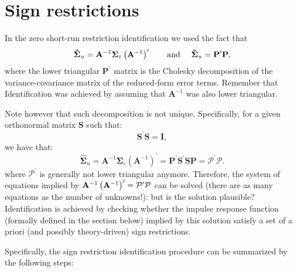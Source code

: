 \documentclass[11pt,a4paper]{report}
\numberwithin{equation}{chapter}
\numberwithin{section}{chapter}
\begin{document}
\section{Sign restrictions}

In the zero short-run restriction identification we used the fact that%
\begin{equation*}
\mathbf{\hat{\Sigma}}_{u}=\mathbf{A}^{-1}\mathbf{\Sigma }_{\varepsilon
}\left( \mathbf{A}^{-1}\right) ^{\prime }\text{ \ \ \ and \ \ \ }\mathbf{%
\hat{\Sigma}}_{u}=\mathbf{P}^{\prime }\mathbf{P,}
\end{equation*}%
where the lower triangular $\mathbf{P}^{\prime }$ matrix is the Cholesky
decomposition of the variance-covariance matrix of the reduced-form error
terms. Remember that Identification was achieved by assuming that $\mathbf{A}%
^{-1}$ was also lower triangular.

Note however that such decomposition is not unique. Specifically, for a
given orthonormal matrix $\mathbf{S}$ such that:%
\begin{equation*}
\mathbf{S}^{\prime }\mathbf{S}=\mathbf{I},
\end{equation*}%
we have that:%
\begin{equation*}
\mathbf{\hat{\Sigma}}_{u}=\mathbf{A}^{-1}\mathbf{\Sigma }_{\varepsilon
}\left( \mathbf{A}^{-1}\right) ^{\prime }=\mathbf{P}^{\prime }\mathbf{S}%
^{\prime }\mathbf{SP=}\mathcal{P}^{\prime }\mathcal{P}\mathbf{.}
\end{equation*}%
where $\mathcal{P}^{\prime }$ is generally not lower triangular anymore.
Therefore, the system of equations implied by $\mathbf{A}^{-1}\left( \mathbf{%
A}^{-1}\right) ^{\prime }=\mathcal{P}^{\prime }\mathcal{P}$ can be solved
(there are as many equations as the number of unknowns!): but is the
solution plausible? Identification is achieved by checking whether the
impulse response function (formally defined in the section below) implied by
this solution satisfy a set of a priori (and possibly theory-driven) sign
restrictions.

Specifically, the sign restriction identification procedure can be
summarized by the following steps:
\end{document}
